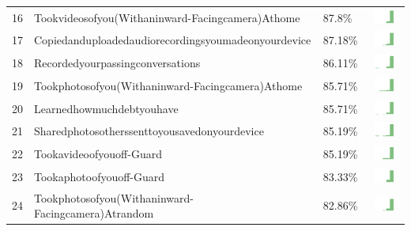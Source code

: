 \documentclass[a4paper,12pt]{article}
\begin{document}
\begin{longtable}{| p{0.5cm} | p{7cm} | p{1cm} | c |}
16 & Tookvideosofyou(Withaninward-Facingcamera)Athome & 87.8\% & \includegraphics[width = 2cm, height = 0.5cm]{tookvideosofyou(withaninward-facingcamera)athomeFRIENDS} \\  
17 & Copiedanduploadedaudiorecordingsyoumadeonyourdevice & 87.18\% & \includegraphics[width = 2cm, height = 0.5cm]{copiedanduploadedaudiorecordingsyoumadeonyourdeviceFRIENDS} \\  
18 & Recordedyourpassingconversations & 86.11\% & \includegraphics[width = 2cm, height = 0.5cm]{recordedyourpassingconversationsFRIENDS} \\  
19 & Tookphotosofyou(Withaninward-Facingcamera)Athome & 85.71\% & \includegraphics[width = 2cm, height = 0.5cm]{tookphotosofyou(withaninward-facingcamera)athomeFRIENDS} \\  
20 & Learnedhowmuchdebtyouhave & 85.71\% & \includegraphics[width = 2cm, height = 0.5cm]{learnedhowmuchdebtyouhaveFRIENDS} \\  
21 & Sharedphotosotherssenttoyousavedonyourdevice & 85.19\% & \includegraphics[width = 2cm, height = 0.5cm]{sharedphotosotherssenttoyousavedonyourdeviceFRIENDS} \\  
22 & Tookavideoofyouoff-Guard & 85.19\% & \includegraphics[width = 2cm, height = 0.5cm]{tookavideoofyouoff-guardFRIENDS} \\  
23 & Tookaphotoofyouoff-Guard & 83.33\% & \includegraphics[width = 2cm, height = 0.5cm]{tookaphotoofyouoff-guardFRIENDS} \\  
24 & Tookphotosofyou(Withaninward-Facingcamera)Atrandom & 82.86\% & \includegraphics[width = 2cm, height = 0.5cm]{tookphotosofyou(withaninward-facingcamera)atrandomFRIENDS} \\  

\end{longtable}
\end{document}
